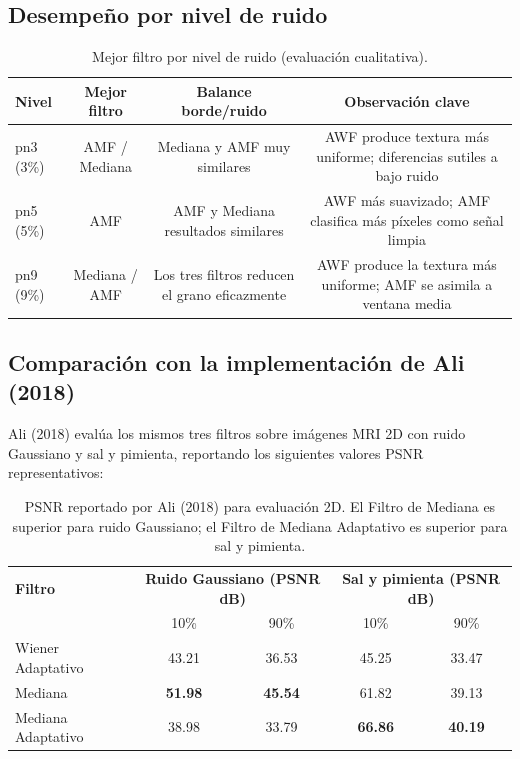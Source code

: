 \documentclass[12pt, a4paper]{article}
\begin{document}
\subsection{Desempeño por nivel de ruido}

\begin{table}[H]
\centering
\renewcommand{\arraystretch}{1.5}
\begin{tabular}{lccc}
\toprule
\textbf{Nivel} & \textbf{Mejor filtro} & \textbf{Balance borde/ruido} & \textbf{Observación clave} \\
\midrule
pn3 (3\%) & AMF / Mediana & Mediana y AMF muy similares &
  AWF produce textura más uniforme; diferencias sutiles a bajo ruido \\
pn5 (5\%) & AMF & AMF y Mediana resultados similares &
  AWF más suavizado; AMF clasifica más píxeles como señal limpia \\
pn9 (9\%) & Mediana / AMF & Los tres filtros reducen el grano eficazmente &
  AWF produce la textura más uniforme; AMF se asimila a ventana media \\
\bottomrule
\end{tabular}
\caption{Mejor filtro por nivel de ruido (evaluación cualitativa).}
\end{table}

\subsection{Comparación con la implementación de Ali (2018)}

Ali (2018) evalúa los mismos tres filtros sobre imágenes MRI 2D con ruido Gaussiano y
sal y pimienta, reportando los siguientes valores PSNR representativos:

\begin{table}[H]
\centering
\renewcommand{\arraystretch}{1.3}
\begin{tabular}{lcccc}
\toprule
\textbf{Filtro} & \multicolumn{2}{c}{\textbf{Ruido Gaussiano (PSNR dB)}} &
                  \multicolumn{2}{c}{\textbf{Sal y pimienta (PSNR dB)}} \\
 & 10\% & 90\% & 10\% & 90\% \\
\midrule
Wiener Adaptativo & 43.21 & 36.53 & 45.25 & 33.47 \\
Mediana           & \textbf{51.98} & \textbf{45.54} & 61.82 & 39.13 \\
Mediana Adaptativo & 38.98 & 33.79 & \textbf{66.86} & \textbf{40.19} \\
\bottomrule
\end{tabular}
\caption{PSNR reportado por Ali (2018) para evaluación 2D. El Filtro de Mediana es
  superior para ruido Gaussiano; el Filtro de Mediana Adaptativo es superior para
  sal y pimienta.}
\end{table}
\end{document}
